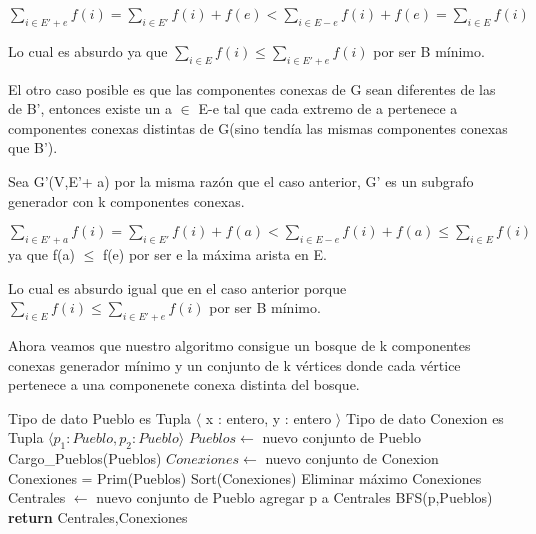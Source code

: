 $\sum_{i \in E'+e} f(i) = \sum_{i \in E'} f(i) + f(e) < \sum_{i \in E-e} f(i) + f(e) = \sum_{i \in E} f(i)$

Lo cual es absurdo ya que $\sum_{i \in E} f(i) \leq \sum_{i \in E'+e} f(i)$ por ser B mínimo.

El otro caso posible es que las componentes conexas de G sean diferentes de las de B', entonces existe un a $\in$ E-e tal que cada extremo de a pertenece a componentes conexas distintas de G(sino tendía las mismas componentes conexas que B').

Sea G'(V,E'+ a) por la misma razón que el caso anterior, G' es un subgrafo generador con k componentes conexas.

$\sum_{i \in E'+a} f(i) = \sum_{i \in E'} f(i) + f(a) < \sum_{i \in E-e} f(i) + f(a) \leq \sum_{i \in E} f(i)$ ya que f(a) $\leq$ f(e) por ser e la máxima arista en E.

Lo cual es absurdo igual que en el caso anterior porque $\sum_{i \in E} f(i) \leq \sum_{i \in E'+e} f(i)$ por ser B mínimo.

Ahora veamos que nuestro algoritmo consigue un bosque de k componentes conexas generador mínimo y un conjunto de k vértices donde cada vértice pertenece a una componenete conexa distinta del bosque.

\begin{center}
\begin{pseudo}
\State Tipo de dato Pueblo es Tupla $\langle$ x : entero, y : entero $\rangle$
\State Tipo de dato Conexion es Tupla $\langle p_1 : Pueblo, p_2 : Pueblo \rangle$
        \State $Pueblos \leftarrow$ nuevo conjunto de Pueblo 
        \State Cargo\_Pueblos(Pueblos) 
        \State $Conexiones \leftarrow$ nuevo conjunto de Conexion 
        \State Conexiones = Prim(Pueblos) 
        \State Sort(Conexiones) 
         
	  \State Eliminar máximo Conexiones 
	\EndFor
        \State Centrales $\leftarrow$ nuevo conjunto de Pueblo 
        \State agregar p a Centrales
        \State BFS(p,Pueblos)
        \EndWhile
        \State \textbf{return} Centrales,Conexiones 
    \EndProcedure
\end{pseudo}
\end{center}

